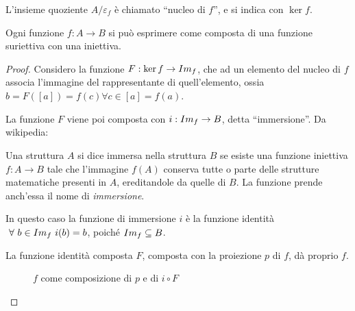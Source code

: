 \begin{defn}
L'insieme quoziente $A / \varepsilon_f$ \`e chiamato ``nucleo di $f$'', e si indica con $\ker f$.
\end{defn}

\begin{prop}
Ogni funzione $f : A \to B$ si pu\`o esprimere come composta di una funzione suriettiva con una iniettiva.
\end{prop}

\begin{proof}
Considero la funzione $F : \ker f \to Im_{f}$, che ad un elemento del nucleo di $f$ associa l'immagine del rappresentante di quell'elemento, ossia $b = F([a]) = f(c) \forall c \in [a] = f(a)$.

La funzione $F$ viene poi composta con $i : Im_{f} \to B $, detta ``immersione''. Da wikipedia:
\begin{defn}[Immersione]
Una struttura $A$  si dice immersa nella struttura $B$ se esiste una funzione iniettiva $f: A \to B$ tale che l'immagine $f(A)$ conserva tutte o parte delle strutture matematiche presenti in $A$, ereditandole da quelle di $B$. La funzione prende anch'essa il nome di \textit{immersione}.
\end{defn} 
In questo caso la funzione di immersione $i$ \`e la funzione identit\`a $ \forall b \in \image{f} \ i(b) = b$, poich\'e $Im_{f} \subseteq B$.

La funzione identit\`a composta $F$, composta con la proiezione $p$ di $f$, d\`a proprio $f$.

\begin{figure}[ht]
\centering
{}
\caption{$f$ come composizione di $p$ e di $i \circ F$}
\end{figure}
\end{proof}

